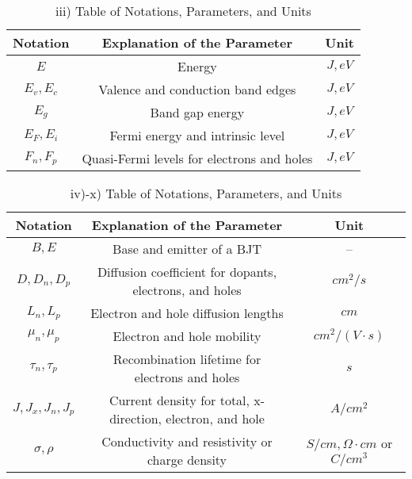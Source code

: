 \begin{table}[H]
    \centering
    \caption{iii) Table of Notations, Parameters, and Units}
    \begin{tabular}{ccc}
        \hline
        \textbf{Notation} & \textbf{Explanation of the Parameter} & \textbf{Unit} \\
        \hline
        $E$ & Energy & $J, eV$ \\
        $E_v, E_c$ & Valence and conduction band edges & $J, eV$ \\
        $E_g$ & Band gap energy & $J, eV$ \\
        $E_F, E_i$ & Fermi energy and intrinsic level & $J, eV$ \\
        $F_n, F_p$ & Quasi-Fermi levels for electrons and holes & $J, eV$ \\
    \end{tabular}
    \label{tab:notations3}
\end{table}

\begin{table}[H]
    \centering
    \caption{iv)-x) Table of Notations, Parameters, and Units}
    \begin{tabular}{ccc}
        \hline
        \textbf{Notation} & \textbf{Explanation of the Parameter} & \textbf{Unit} \\
        \hline
        $B, E$ & Base and emitter of a BJT & -- \\ 
        $D, D_n, D_p$ & Diffusion coefficient for dopants, electrons, and holes & $cm^2/s$ \\
        $L_n, L_p$ & Electron and hole diffusion lengths & $cm$ \\
        $\mu_n, \mu_p$ & Electron and hole mobility & $cm^2/(V \cdot s)$ \\
        $\tau_n, \tau_p$ & Recombination lifetime for electrons and holes & $s$ \\
        $J, J_x, J_n, J_p$ & Current density for total, x-direction, electron, and hole & $A/cm^2$ \\
        $\sigma, \rho$ & Conductivity and resistivity or charge density & $S/cm, \Omega \cdot cm$ or $C/cm^3$ \\
    \end{tabular}
    \label{tab:notations4}
\end{table}


